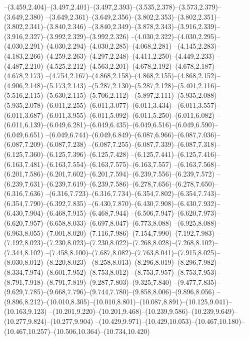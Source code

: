   --(3.459,2.404)--(3.497,2.401)--(3.497,2.393)--(3.535,2.378)--(3.573,2.379)--(3.649,2.380)%
  --(3.649,2.361)--(3.649,2.356)--(3.802,2.353)--(3.802,2.351)--(3.802,2.341)--(3.840,2.346)%
  --(3.840,2.349)--(3.878,2.343)--(3.916,2.339)--(3.916,2.327)--(3.992,2.329)--(3.992,2.326)%
  --(4.030,2.322)--(4.030,2.295)--(4.030,2.291)--(4.030,2.294)--(4.030,2.285)--(4.068,2.281)%
  --(4.145,2.283)--(4.183,2.266)--(4.259,2.263)--(4.297,2.248)--(4.411,2.250)--(4.449,2.233)%
  --(4.487,2.210)--(4.525,2.212)--(4.563,2.201)--(4.678,2.192)--(4.678,2.187)--(4.678,2.173)%
  --(4.754,2.167)--(4.868,2.158)--(4.868,2.155)--(4.868,2.152)--(4.906,2.148)--(5.173,2.143)%
  --(5.287,2.130)--(5.287,2.128)--(5.401,2.116)--(5.516,2.115)--(5.630,2.115)--(5.706,2.112)%
  --(5.897,2.111)--(5.935,2.088)--(5.935,2.078)--(6.011,2.255)--(6.011,3.077)--(6.011,3.434)%
  --(6.011,3.557)--(6.011,3.687)--(6.011,3.955)--(6.011,5.092)--(6.011,5.250)--(6.011,6.082)%
  --(6.011,6.139)--(6.049,6.281)--(6.049,6.435)--(6.049,6.516)--(6.049,6.590)--(6.049,6.651)%
  --(6.049,6.744)--(6.049,6.849)--(6.087,6.966)--(6.087,7.036)--(6.087,7.209)--(6.087,7.238)%
  --(6.087,7.255)--(6.087,7.339)--(6.087,7.318)--(6.125,7.360)--(6.125,7.396)--(6.125,7.428)%
  --(6.125,7.441)--(6.125,7.416)--(6.163,7.481)--(6.163,7.554)--(6.163,7.575)--(6.163,7.557)%
  --(6.163,7.568)--(6.201,7.586)--(6.201,7.602)--(6.201,7.594)--(6.239,7.556)--(6.239,7.572)%
  --(6.239,7.631)--(6.239,7.619)--(6.239,7.586)--(6.278,7.656)--(6.278,7.650)--(6.316,7.636)%
  --(6.316,7.723)--(6.316,7.734)--(6.354,7.802)--(6.354,7.743)--(6.354,7.790)--(6.392,7.835)%
  --(6.430,7.870)--(6.430,7.908)--(6.430,7.932)--(6.430,7.904)--(6.468,7.915)--(6.468,7.944)%
  --(6.506,7.947)--(6.620,7.973)--(6.620,7.957)--(6.658,8.033)--(6.697,8.047)--(6.773,8.088)%
  --(6.925,8.088)--(6.963,8.055)--(7.001,8.020)--(7.116,7.986)--(7.154,7.990)--(7.192,7.983)%
  --(7.192,8.023)--(7.230,8.023)--(7.230,8.022)--(7.268,8.028)--(7.268,8.102)--(7.344,8.102)%
  --(7.458,8.100)--(7.687,8.082)--(7.763,8.041)--(7.915,8.025)--(8.030,8.012)--(8.220,8.023)%
  --(8.258,8.013)--(8.296,8.019)--(8.296,7.982)--(8.334,7.974)--(8.601,7.952)--(8.753,8.012)%
  --(8.753,7.957)--(8.753,7.953)--(8.791,7.918)--(8.791,7.819)--(9.287,7.803)--(9.325,7.840)%
  --(9.477,7.835)--(9.629,7.785)--(9.668,7.796)--(9.744,7.780)--(9.858,8.006)--(9.896,8.056)%
  --(9.896,8.212)--(10.010,8.305)--(10.010,8.801)--(10.087,8.891)--(10.125,9.041)--(10.163,9.123)%
  --(10.201,9.220)--(10.201,9.468)--(10.239,9.586)--(10.239,9.649)--(10.277,9.824)--(10.277,9.904)%
  --(10.429,9.971)--(10.429,10.053)--(10.467,10.180)--(10.467,10.257)--(10.506,10.364)--(10.734,10.420)%
